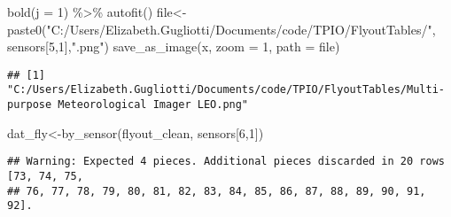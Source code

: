 \documentclass[
]{article}
\newenvironment{Shaded}{\begin{snugshade}}{\end{snugshade}}
\newcommand{\AttributeTok}[1]{\textcolor[rgb]{0.77,0.63,0.00}{#1}}
\newcommand{\DecValTok}[1]{\textcolor[rgb]{0.00,0.00,0.81}{#1}}
\newcommand{\FunctionTok}[1]{\textcolor[rgb]{0.00,0.00,0.00}{#1}}
\newcommand{\NormalTok}[1]{#1}
\newcommand{\OtherTok}[1]{\textcolor[rgb]{0.56,0.35,0.01}{#1}}
\newcommand{\SpecialCharTok}[1]{\textcolor[rgb]{0.00,0.00,0.00}{#1}}
\newcommand{\StringTok}[1]{\textcolor[rgb]{0.31,0.60,0.02}{#1}}
\begin{document}
\begin{Shaded}
\begin{Highlighting}[]
    \FunctionTok{bold}\NormalTok{(}\AttributeTok{j =} \DecValTok{1}\NormalTok{) }\SpecialCharTok{\%\textgreater{}\%} \FunctionTok{autofit}\NormalTok{()}
\NormalTok{file}\OtherTok{\textless{}{-}}\FunctionTok{paste0}\NormalTok{(}\StringTok{"C:/Users/Elizabeth.Gugliotti/Documents/code/TPIO/FlyoutTables/"}\NormalTok{, sensors[}\DecValTok{5}\NormalTok{,}\DecValTok{1}\NormalTok{],}\StringTok{".png"}\NormalTok{)}
\FunctionTok{save\_as\_image}\NormalTok{(x, }\AttributeTok{zoom =} \DecValTok{1}\NormalTok{, }\AttributeTok{path =}\NormalTok{ file)}
\end{Highlighting}
\end{Shaded}

\begin{verbatim}
## [1] "C:/Users/Elizabeth.Gugliotti/Documents/code/TPIO/FlyoutTables/Multi-purpose Meteorological Imager LEO.png"
\end{verbatim}

\begin{Shaded}
\begin{Highlighting}[]
\NormalTok{dat\_fly}\OtherTok{\textless{}{-}}\FunctionTok{by\_sensor}\NormalTok{(flyout\_clean, sensors[}\DecValTok{6}\NormalTok{,}\DecValTok{1}\NormalTok{])}
\end{Highlighting}
\end{Shaded}

\begin{verbatim}
## Warning: Expected 4 pieces. Additional pieces discarded in 20 rows [73, 74, 75,
## 76, 77, 78, 79, 80, 81, 82, 83, 84, 85, 86, 87, 88, 89, 90, 91, 92].
\end{verbatim}
\end{document}
